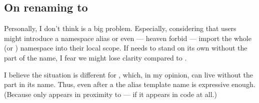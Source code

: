 \subsection{On renaming  to }
Personally, I don't think \std{} is a big problem.
Especially, considering that users might introduce a namespace alias or even
--- heaven forbid --- import the whole \std{} (or
\std{}) namespace into their local scope.
If  needs to stand on its own without the  part of the
name, I fear we might lose clarity compared to .

I believe the situation is different for \std{}, which,
in my opinion, can live without the  part in its name.
Thus, even after a  the alias template name
 is expressive enough.
(Because  only appears in proximity to  --- if it
appears in code at all.)
